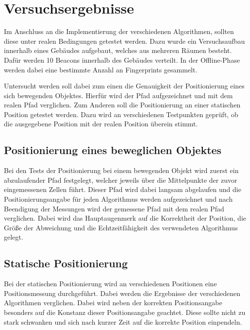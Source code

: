 \chapter{Versuchsergebnisse}
\label{chap:testing}

Im Anschluss an die Implementierung der verschiedenen Algorithmen, sollten diese unter realen Bedingungen getestet werden. 
Dazu wurde ein Versuchsaufbau innerhalb eines Gebäudes aufgebaut, welches aus mehreren Räumen besteht. Dafür werden 10 Beacons innerhalb des Gebäudes verteilt. 
In der Offline-Phase werden dabei eine bestimmte Anzahl an Fingerprints gesammelt.

Untersucht werden soll dabei zum einen die Genauigkeit der Positionierung eines sich bewegenden Objektes. Hierfür wird der Pfad aufgezeichnet und mit dem realen Pfad verglichen.
Zum Anderen soll die Positionierung an einer statischen Position getestet werden. Dazu wird an verschiedenen Testpunkten geprüft, ob die ausgegebene Position mit der realen Position überein stimmt.

\section{Positionierung eines beweglichen Objektes}
\label{sec:testing:moving}

Bei den Tests der Positionierung bei einem bewegenden Objekt wird zuerst ein abzulaufender Pfad festgelegt, welcher jeweils über die Mittelpunkte der zuvor eingemessenen Zellen führt. Dieser Pfad wird dabei langsam abgelaufen und die Positionierungsangabe für jeden Algorithmus werden aufgezeichnet und nach Beendigung der Messungen wird der gemessene Pfad mit dem realen Pfad verglichen. Dabei wird das Hauptaugenmerk auf die Korrektheit der Position, die Größe der Abweichung und die Echtzeitfähigkeit des verwendeten Algorithmus gelegt.

\section{Statische Positionierung}
\label{sec:testing:static}

Bei der statischen Positionierung wird an verschiedenen Positionen eine Positionsmessung durchgeführt. Dabei werden die Ergebnisse der verschiedenen Algorithmen verglichen. Dabei wird neben der korrekten Positionsangabe besonders auf die Konstanz dieser Positionsangabe geachtet. Diese sollte nicht zu stark schwanken und sich nach kurzer Zeit auf die korrekte Position einpendeln.
